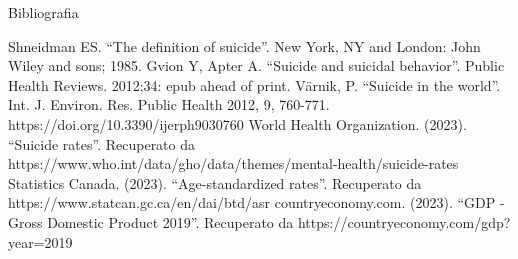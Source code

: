 \documentclass{beamer}
\begin{document}
\appendix

\begin{frame}{Bibliografia}
	\nocite{*} %
	\begin{thebibliography}{00}
		 Shneidman ES. ``The definition of suicide''. New York, NY and London: John Wiley and sons; 1985.
		 Gvion Y, Apter A. ``Suicide and suicidal behavior''. Public Health Reviews. 2012;34: epub ahead of print.
		 Värnik, P. ``Suicide in the world''. Int. J. Environ. Res. Public Health 2012, 9, 760-771. https://doi.org/10.3390/ijerph9030760 
		 World Health Organization. (2023). ``Suicide rates''. Recuperato da https://www.who.int/data/gho/data/themes/mental-health/suicide-rates
		 Statistics Canada. (2023). ``Age-standardized rates''. Recuperato da https://www.statcan.gc.ca/en/dai/btd/asr
		 countryeconomy.com. (2023). ``GDP - Gross Domestic Product 2019''. Recuperato da https://countryeconomy.com/gdp?year=2019
	\end{thebibliography}
	
\end{frame}
\end{document}
